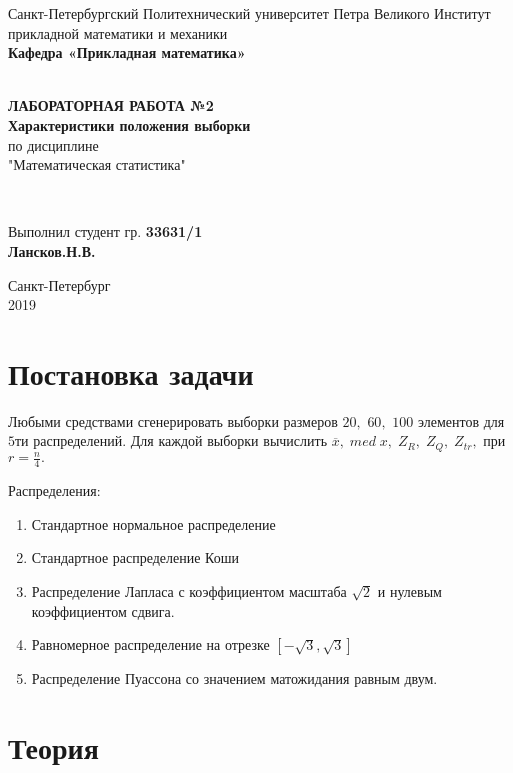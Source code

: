 \documentclass[12pt]{article}
\begin{document}
\begin{titlepage}
	\center
		Санкт-Петербургский Политехнический 
		университет Петра Великого
		Институт прикладной математики и механики
		\\ \textbf{Кафедра «Прикладная математика»}

	\vfill ~
	\textbf{
		\\ \large ЛАБОРАТОРНАЯ РАБОТА №2
		\\	\normalsize	
			Характеристики положения выборки
	}
	\\	по дисциплине 
	\\	"Математическая статистика"

	\vfill ~

	Выполнил студент гр. \textbf{33631/1} \\
	\textbf{Лансков.Н.В.} \\ 

\vfill

{\large}	Санкт-Петербург
\\ 2019
\end{titlepage}

\tableofcontents
\newpage
\listoftables
\newpage
\pagebreak


\section{Постановка задачи}
Любыми средствами сгенерировать выборки размеров $20,$ $60,$ $100$ элементов для $5$ти распределений. Для каждой выборки вычислить $\overline{x},\; med\; x,\; Z_R,\; Z_Q,\; Z_{tr},$ при $r = \frac{n}{4}.$

Распределения:
\begin{enumerate}
\item Стандартное нормальное распределение
\item Стандартное распределение Коши
\item Распределение Лапласа с коэффициентом масштаба $\sqrt{2}$ и нулевым коэффициентом сдвига.
\item Равномерное распределение на отрезке $\left[-\sqrt{3}, \sqrt{3}\right]$
\item Распределение Пуассона со значением матожидания равным двум.
\end{enumerate}

\section{Теория}
\end{document}
